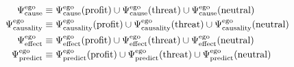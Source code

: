 \begin{align}
    \Psi^{\mathrm{ego}}_{\mathrm{cause}}     &\equiv \Psi^{\mathrm{ego}}_{\mathrm{cause}}(\mathrm{profit}) \cup \Psi^{\mathrm{ego}}_{\mathrm{cause}}(\mathrm{threat}) \cup \Psi^{\mathrm{ego}}_{\mathrm{cause}}(\mathrm{neutral}) \\
    \Psi^{\mathrm{ego}}_{\mathrm{causality}} &\equiv \Psi^{\mathrm{ego}}_{\mathrm{causality}}(\mathrm{profit}) \cup \Psi^{\mathrm{ego}}_{\mathrm{causality}}(\mathrm{threat}) \cup \Psi^{\mathrm{ego}}_{\mathrm{causality}}(\mathrm{neutral}) \\
    \Psi^{\mathrm{ego}}_{\mathrm{effect}}    &\equiv \Psi^{\mathrm{ego}}_{\mathrm{effect}}(\mathrm{profit}) \cup \Psi^{\mathrm{ego}}_{\mathrm{effect}}(\mathrm{threat}) \cup \Psi^{\mathrm{ego}}_{\mathrm{effect}}(\mathrm{neutral}) \\
    \Psi^{\mathrm{ego}}_{\mathrm{predict}}   &\equiv \Psi^{\mathrm{ego}}_{\mathrm{predict}}(\mathrm{profit}) \cup \Psi^{\mathrm{ego}}_{\mathrm{predict}}(\mathrm{threat}) \cup \Psi^{\mathrm{ego}}_{\mathrm{predict}}(\mathrm{neutral})
\end{align}


